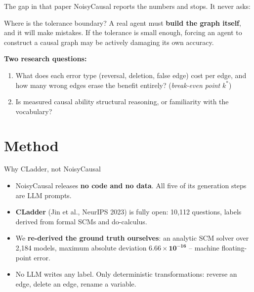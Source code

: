 \documentclass{beamer}
\begin{document}
\begin{frame}{The gap in that paper}
  NoisyCausal reports the numbers and stops. It never asks:

  \begin{block}{Where is the tolerance boundary?}
    A real agent must \textbf{build the graph itself}, and it will make mistakes.
    If the tolerance is small enough, forcing an agent to construct a causal
    graph may be actively damaging its own accuracy.
  \end{block}

  \vspace{0.4cm}
  \textbf{Two research questions:}

  \begin{enumerate}
    \item[\textbf{Q1}] What does each error type (reversal, deletion, false edge)
      cost per edge, and how many wrong edges erase the benefit entirely?
      (\emph{break-even point} $k^*$)
    \item[\textbf{Q2}] Is measured causal ability structural reasoning, or
      familiarity with the vocabulary?
  \end{enumerate}
\end{frame}

\section{Method}
\begin{frame}
  \sectionpage
\end{frame}

\begin{frame}{Why CLadder, not NoisyCausal}
  \begin{itemize}
    \item NoisyCausal releases \textbf{no code and no data}. All five of its
      generation steps are LLM prompts.
    \item \textbf{CLadder} (Jin et al., NeurIPS 2023) is fully open: 10{,}112
      questions, labels derived from formal SCMs and do-calculus.
    \item We \textbf{re-derived the ground truth ourselves}: an analytic SCM
      solver over 2{,}184 models, maximum absolute deviation
      $\mathbf{6.66 \times 10^{-16}}$ -- machine floating-point error.
    \item No LLM writes any label. Only deterministic transformations:
      reverse an edge, delete an edge, rename a variable.
  \end{itemize}
\end{frame}
\end{document}
